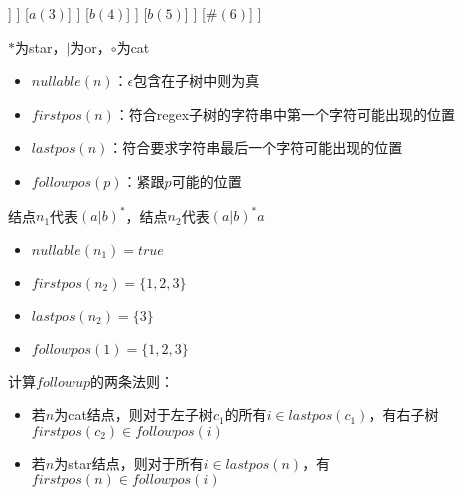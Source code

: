 \begin{minipage}{0.25\linewidth}
\begin{forest}
[$\circ$
	[$\circ$
		[$\circ$
			[$\circ(n_2)$
				[$*(n_1)$
					[$|$
						[$a(1)$]
						[$b(2)$]
					]
				]
				[$a(3)$]
			]
			[$b(4)$]
		]
		[$b(5)$]
	]
	[$\#(6)$]
]
\end{forest}
\end{minipage}
\begin{minipage}{0.75\linewidth}
$*$为star，$|$为or，$\circ$为cat
\begin{itemize}
	\item $nullable(n)$：$\epsilon$包含在子树中则为真
	\item $firstpos(n)$：符合regex子树的字符串中第一个字符可能出现的位置
	\item $lastpos(n)$：符合要求字符串最后一个字符可能出现的位置
	\item $followpos(p)$：紧跟$p$可能的位置
\end{itemize}
\begin{example}
结点$n_1$代表$(a|b)^*$，结点$n_2$代表$(a|b)^*a$
\begin{itemize}
	\item $nullable(n_1)=true$
	\item $firstpos(n_2)=\{1,2,3\}$
	\item $lastpos(n_2)=\{3\}$
	\item $followpos(1)=\{1,2,3\}$
\end{itemize}
\end{example}
\end{minipage}

\bigskip
计算$followup$的两条法则：
\begin{itemize}
	\item 若$n$为cat结点，则对于左子树$c_1$的所有$i\in lastpos(c_1)$，有右子树$firstpos(c_2)\in followpos(i)$
	\item 若$n$为star结点，则对于所有$i\in lastpos(n)$，有$firstpos(n)\in followpos(i)$
\end{itemize}

